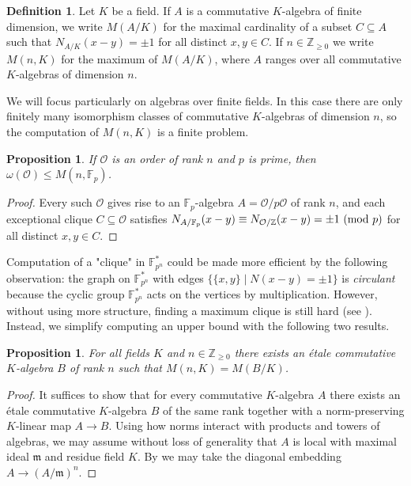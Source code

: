 \documentclass{amsart}
\theoremstyle{plain}
\newtheorem{proposition}[theorem]{Proposition}
\theoremstyle{definition}
\newtheorem{definition}[theorem]{Definition}
\newcommand{\Z}{\ensuremath{\mathbb{Z}}}
\newcommand{\F}{\ensuremath{\mathbb{F}}}
\newcommand{\m}{\ensuremath{\mathfrak{m}}}
\newcommand{\clq}{C}
\newcommand{\inote}[1]{\textbf{\color{red}Ignacio: #1}}
\begin{document}
\begin{definition}\label{def:M}
	Let \(K\) be a field. 
	If \(A\) is a commutative \(K\)-algebra of finite dimension, we write \(M(A/K)\) for the maximal cardinality of a subset \(\clq\subseteq A\) such that \(N_{A/K}(x-y)=\pm 1\) for all distinct \(x,y\in \clq\). If \(n\in\Z_{\geq 0}\) we write \(M(n,K)\) for the maximum of \(M(A/K)\), where \(A\) ranges over all commutative \(K\)-algebras of dimension $n$.
\end{definition}

We will focus particularly on algebras over finite fields. In this case there are only finitely many isomorphism classes of commutative $K$-algebras of dimension $n$, so the computation of \(M(n,K)\) is a finite problem.

\begin{proposition}\label{prop:LleqM}
	If \(\mathcal{O}\) is an order of rank \(n\) and \(p\) is prime, then \(\omega(\mathcal{O})\leq M(n,\F_p)\).
\end{proposition}
\begin{proof}
	Every such \(\mathcal{O}\) gives rise to an \(\F_p\)-algebra \(A=\mathcal{O}/p\mathcal{O}\) of rank \(n\), and each exceptional clique \(\clq\subseteq \mathcal{O}\) satisfies \(N_{A/\F_p}(x-y)\equiv N_{\mathcal{O}/\Z}(x-y) = \pm 1\ (\textup{mod }p)\) for all distinct \(x,y\in \clq\).
\end{proof}

Computation of a "clique" in \(\F_{p^n}^*\) could be made more efficient by the following observation: the graph on \(\F_{p^n}^*\) with edges \(\{\{x,y\} \mid N(x-y)=\pm1\}\) is \emph{circulant} because the cyclic group \(\F_{p^n}^*\) acts on the vertices by multiplication. However, without using more structure, finding a maximum clique is still hard (see \cite{CODENOTTI1998123}).
Instead, we simplify computing an upper bound with the following two results.

\begin{proposition}
	For all fields \(K\) and \(n\in\Z_{\geq 0}\) there exists an \'etale commutative \(K\)-algebra \(B\) of rank \(n\) such that \(M(n,K)=M(B/K)\).
\end{proposition}
\begin{proof}
	It suffices to show that for every commutative \(K\)-algebra \(A\) there exists an \'etale commutative \(K\)-algebra \(B\) of the same rank together with a norm-preserving \(K\)-linear map \(A\to B\). 
	Using how norms interact with products and towers of algebras, we may assume without loss of generality that \(A\) is local with maximal ideal \(\m\) and residue field \(K\).
	By \cite[Proposition~III\S{}9.4.5]{Bourbaki} we may take the diagonal embedding \(A\to (A/\m)^n\).
\end{proof}
\end{document}
